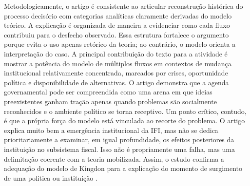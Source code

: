 \documentclass[12pt,a4paper]{article}
\begin{document}
Metodologicamente, o artigo é consistente ao articular reconstrução histórica do processo decisório com categorias analíticas claramente derivadas do modelo teórico. A explicação é organizada de maneira a evidenciar como cada fluxo contribuiu para o desfecho observado. Essa estrutura fortalece o argumento porque evita o uso apenas retórico da teoria; ao contrário, o modelo orienta a interpretação do caso.
A principal contribuição do texto para a atividade é mostrar a potência do modelo de múltiplos fluxos em contextos de mudança institucional relativamente concentrada, marcados por crises, oportunidade política e disponibilidade de alternativas. O artigo demonstra que a agenda governamental pode ser compreendida como uma arena em que ideias preexistentes ganham tração apenas quando problemas são socialmente reconhecidos e o ambiente político se torna receptivo.
Um ponto crítico, contudo, é que a própria força do modelo está vinculada ao recorte do problema. O artigo explica muito bem a emergência institucional da IFI, mas não se dedica prioritariamente a examinar, em igual profundidade, os efeitos posteriores da instituição no subsistema fiscal. Isso não é propriamente uma falha, mas uma delimitação coerente com a teoria mobilizada. Assim, o estudo confirma a adequação do modelo de Kingdon para a explicação do momento de surgimento de uma política ou instituição \autocite{bijos2024ifi}.
\end{document}
